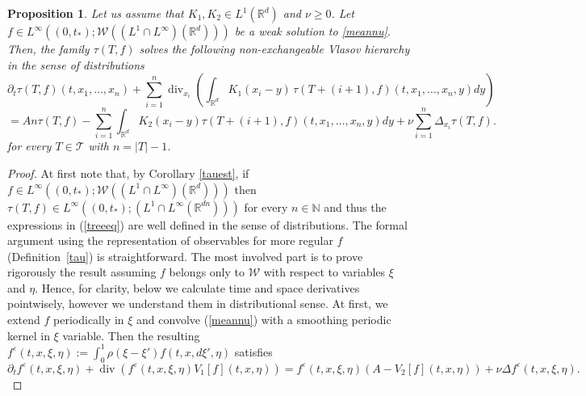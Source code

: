\documentclass[10pt]{article}
\newtheorem{prop}{Proposition}
\def\divv{\operatorname {div}}
\newcommand{\eqq}[2]{\begin{equation}  #1  \label{#2}\end{equation}    }
\newcommand{\ve}{\varepsilon}
\newcommand{\R}{\mathbb{R}}
\newcommand{\izj}{\int_{0}^{1}}
\newcommand{\ird}{\int_{\mathbb{R}^d}}
\newcommand{\Tree}{\mathcal{T}}
\newcommand{\W}{\mathcal{W}}
\begin{document}
\begin{prop}\label{hier}
Let us assume that $K_1, K_2\in L^1(\R^d)$ and $\nu\geq 0$. Let  $f\in L^{\infty}((0,t_{*});\W((L^{1}\cap L^{\infty})(\R^d)))$ be a weak solution to \eqref{meannu}. Then,  the family $\tau(T,f)$ solves the following  non-exchangeable Vlasov hierarchy in the sense of distributions
\[
\partial_t \tau(T,f)(t,x_1,\dots,x_n)+\sum_{i=1}^{n} \divv_{x_i}\left(\int_{\R^d} K_1(x_i-y)\,\tau(T+(i+1),f)(t,x_1,\ldots,x_{n},y) dy\right)
\]
\eqq{
=An\tau(T,f) - \sum_{i=1}^{n}\ird K_2(x_i-y)\tau(T+(i+1),f)(t,x_1,\ldots,x_{n},y)dy +\nu\sum_{i=1}^{n}\Delta_{x_i}\tau(T,f).
}{treeeq}
for every $T\in \Tree$ with $n=|T|-1$.
\end{prop}
\begin{proof}
At first note that, by Corollary \ref{tauest}, if $f\in L^{\infty}((0,t_{*});\W((L^{1}\cap L^{\infty})(\R^d)))$ then $\tau(T,f) \in L^{\infty}((0,t_{*});(L^{1}\cap L^{\infty}(\R^{dn})))$ for every $n \in \mathbb{N}$ and thus the expressions in (\ref{treeeq}) are well defined in the sense of distributions. The formal argument using the representation of observables for more regular $f$ (Definition~\ref{tau}) is straightforward. The most involved part is to prove rigorously the result assuming $f$ belongs only to $\W$ with respect to variables $\xi$ and $\eta$. Hence, for clarity, below we calculate time and space derivatives pointwisely, however we understand them in distributional sense. At first, we extend $f$ periodically in $\xi$ and convolve (\ref{meannu}) with a smoothing periodic kernel in $\xi$ variable. Then the resulting $f^\ve(t,x,\xi,\eta):= \izj \rho(\xi-\xi')f(t,x,d\xi',\eta)$ satisfies
\[
\partial_t f^\ve(t,x,\xi,\eta) + \divv ( f^\ve(t,x,\xi,\eta) V_1[f](t,x,\eta)) =  f^\ve(t,x,\xi,\eta) (A -V_2[f](t,x,\eta))+\nu \Delta f^\ve(t,x,\xi,\eta).
\]


\end{proof}
\end{document}
